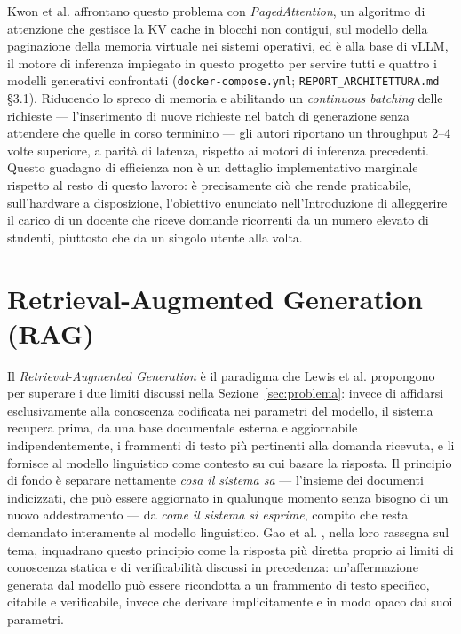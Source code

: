 Kwon et al. \cite{kwon2023vllm} affrontano questo problema con \emph{PagedAttention}, un algoritmo di attenzione che
gestisce la KV cache in blocchi non contigui, sul modello della paginazione della memoria virtuale nei sistemi
operativi, ed è alla base di vLLM, il motore di inferenza impiegato in questo progetto per servire tutti e quattro i
modelli generativi confrontati (\texttt{docker-compose.yml}; \texttt{REPORT\_ARCHITETTURA.md} \S3.1). Riducendo lo
spreco di memoria e abilitando un \emph{continuous batching} delle richieste --- l'inserimento di nuove richieste nel
batch di generazione senza attendere che quelle in corso terminino --- gli autori riportano un throughput 2--4 volte
superiore, a parità di latenza, rispetto ai motori di inferenza precedenti. Questo guadagno di efficienza non è un
dettaglio implementativo marginale rispetto al resto di questo lavoro: è precisamente ciò che rende praticabile,
sull'hardware a disposizione, l'obiettivo enunciato nell'Introduzione di alleggerire il carico di un docente che
riceve domande ricorrenti da un numero elevato di studenti, piuttosto che da un singolo utente alla volta.

\section{Retrieval-Augmented Generation (RAG)}
\label{sec:rag}

Il \emph{Retrieval-Augmented Generation} è il paradigma che Lewis et al. \cite{lewis2020retrieval} propongono per
superare i due limiti discussi nella Sezione~\ref{sec:problema}: invece di affidarsi esclusivamente alla conoscenza
codificata nei parametri del modello, il sistema recupera prima, da una base documentale esterna e aggiornabile
indipendentemente, i frammenti di testo più pertinenti alla domanda ricevuta, e li fornisce al modello linguistico
come contesto su cui basare la risposta. Il principio di fondo è separare nettamente \emph{cosa il sistema sa} ---
l'insieme dei documenti indicizzati, che può essere aggiornato in qualunque momento senza bisogno di un nuovo
addestramento --- da \emph{come il sistema si esprime}, compito che resta demandato interamente al modello
linguistico. Gao et al. \cite{gao2023ragsurvey}, nella loro rassegna sul tema, inquadrano questo principio come la
risposta più diretta proprio ai limiti di conoscenza statica e di verificabilità discussi in precedenza: un'affermazione
generata dal modello può essere ricondotta a un frammento di testo specifico, citabile e verificabile, invece che
derivare implicitamente e in modo opaco dai suoi parametri.

